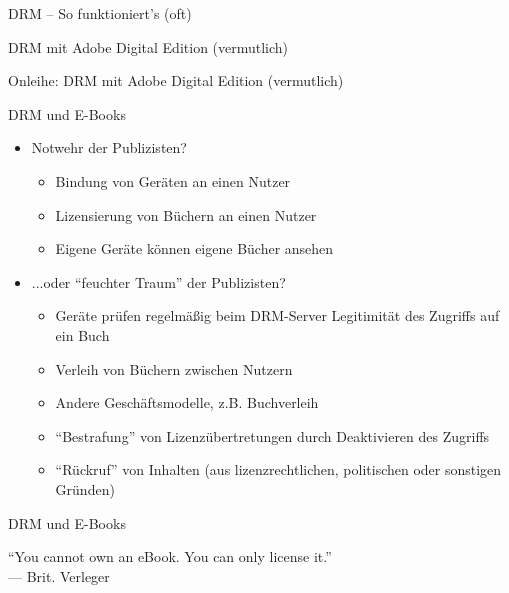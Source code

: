 \begin{frame}{DRM -- So funktioniert's (oft)}
	\begin{center}
		\def\svgwidth{10cm}
		
	\end{center}
\end{frame}

\begin{frame}{DRM mit Adobe Digital Edition (vermutlich)}
	\begin{center}
		\def\svgwidth{10cm}
		
	\end{center}
\end{frame}

\begin{frame}{Onleihe: DRM mit Adobe Digital Edition (vermutlich)}
	\begin{center}
		\def\svgwidth{10cm}
		
	\end{center}
\end{frame}

\begin{frame}{DRM und E-Books}
	\begin{itemize}
		\item Notwehr der Publizisten?
		\begin{itemize}
			\item Bindung von Geräten an einen Nutzer
			\item Lizensierung von Büchern an einen Nutzer
			\item Eigene Geräte können eigene Bücher ansehen
		\end{itemize}
		\item<2-> ...oder "`feuchter Traum"' der Publizisten?
		\begin{itemize}
			\item<2-> Geräte prüfen regelmäßig beim DRM-Server Legitimität des Zugriffs auf ein Buch
			\item<2-> Verleih von Büchern zwischen Nutzern
			\item<2-> Andere Geschäftsmodelle, z.B. Buchverleih
			\item<2-> "`Bestrafung"' von Lizenzübertretungen durch Deaktivieren des Zugriffs
			\item<2-> "`Rückruf"' von Inhalten (aus lizenzrechtlichen, politischen oder sonstigen Gründen)
		\end{itemize}
	\end{itemize}
\end{frame}

\begin{frame}{DRM und E-Books}
	\begin{block}{ }
		"`You cannot own an eBook. You can only license it."' \\
		--- Brit. Verleger
	\end{block}
\end{frame}


